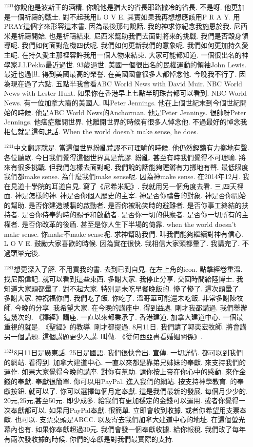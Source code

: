 \documentclass{book}
\begin{document}
$^{1201}$你說他是波斯王的酒精.
你說他是猶大的省長耶路撒冷的省長.
不是呀.
他更加是一個祈禱的戰士.
對不起我用L O V E.
其實如果我再想想應該用P R A Y.
用PRAY這個字來形容這本書.
因為最後那句說話.
我的神求你紀念我施恩於我.
尼西米是祈禱開始.
也是祈禱結束.
尼西米幫助我們去面對將來的挑戰.
我們是否毀身領導呢.
我們如何面對危機四伏呢.
我們如何更新我們的意象呢.
我們如何更加持久愛主呢.
在持久愛主那裡容許我用一個人物來結束.
大家可能都知道.
一個很出名的神學家J.I.Pekka最近過世.
93歲過世.
美國一個很出名的民權運動的領袖John Lewis.
最近也過世.
得到美國最高的榮譽.
在美國國會很多人都悼念他.
今晚我不行了.
因為現在過了六點.
五點半我會看ABC World News with David Muir.
NBC World News with Lester Hunt.
如果你在香港早上七點半明珠台都可以看到.
NBC World News.
有一位加拿大裔的美國人.
叫Peter Jennings.
他在上個世紀末到今個世紀開始的時候.
他是ABC World News的Anchorman.
他是Peter Jennings.
很帥呀Peter Jennings.
他癌症離開世界.
他離開世界的時候有很多人悼念他.
不過最好的悼念我相信就是這句說話.
When the world doesn't make sense, he does.

$^{1241}$中文翻譯就是.
當這個世界紛亂荒謬不可理喻的時候.
他仍然鏗鏘有力擲地有聲.
各位聽眾.
今日我們覺得這個世界真是荒謬.
紛亂.
甚至有時我們覺得不可理喻.
將來有很多挑戰.
但我們怎樣去面對呢.
我們說的話能夠鏗鏘有力擲地有聲.
最低限度我們都make sense.
為什麼我們make sense呢.
因為神make sense.
在2014年12月.
我在見道十學院的耳道自見.
寫了《尼希米記》.
我就用另一個角度去看.
三,四天裡面.
神是怎樣的神.
神是否你個人歷史的主宰.
神是否你禱告的對象.
神是否你開始的幫助.
是否你建造城牆的啟動者.
是否你被恥笑時的避難者.
是否你事工終結的扶持者.
是否你侍奉約時的賜予和啟動者.
是否你一切的供應者.
是否你一切所有的主權者.
是否你改革的後盾.
甚至是你人生下半場的倚靠.
when the world doesn't make sense.
你make不make sense呢.
求神幫助我們.
叫我們能夠繼續對神有信心.
L O V E.
鼓勵大家喜歡的時候.
因為實在很快.
我相信大家頭都暈了.
我講完了.
不過頭暈完後.

$^{1281}$想更深入了解.
不用買我的書.
去到已到自見.
在左上角的icon.
點擊經卷重溫.
找尼熙偉記.
就可以看到這些東西.
多謝大家.
我停止分享.
交回時間給陸博士.
我知道大家頭都暈了.
對不起大家.
特別是未吃早餐晚飯的.
慘了慘了.
這次頭暈了.
多謝大家.
神祝福你們.
我們吃了飯.
你吃了.
溫哥華可能還未吃飯.
非常多謝陳牧師.
今晚的分享.
我希望大家.
在今晚的講座中.
得到益處.
剛才我都講過.
我們舉辦這幾次的.
《釋經》講座.
一直以來都秉承了.
香港建道.
加拿大建道中心.
一個最重視的就是.
《聖經》的教導.
剛才都提過.
8月11日.
我們請了郭奕宏牧師.
將會講另一個講題.
這個講題更少人講.
叫做.
《從何西亞書看婚姻關係》.

$^{1321}$8月11日是廣東話.
25日是國語.
我們很快會出.
宣傳.
一切詳情.
都可以到我們的網站.
看得到.
加拿大建道中心.
一直以來都是靠弟兄姊妹的奉獻.
來支持我們的運作.
如果大家覺得今晚的講座.
對你有幫助.
請你按上帝在你心中的感動.
來作金錢的奉獻.
奉獻很簡單.
你可以用PayPal.
進入我們的網站.
按支持神學教育.
的奉獻按鈕.
就可以了.
你可以選擇每個月定奉獻.
這是我們最新的發展.
每個月少少的.
20元,25元,甚至50元.
即少成多.
給我們有更加穩定的金錢可以運用.
或者你覺得一次奉獻都可以.
如果用PayPal奉獻.
很簡單.
立即會收到收據.
或者你希望用支票奉獻.
也可以.
支票桌頭是ABCC.
以及寄去我們加拿大建道中心的地址.
在這個螢光幕內也有.
如果你奉獻超過30元.
我們會發一個奉獻收據.
給你報稅.
我們改了每年有兩次發收據的時候.
你們的奉獻是對我們最實際的支持.
\end{document}
